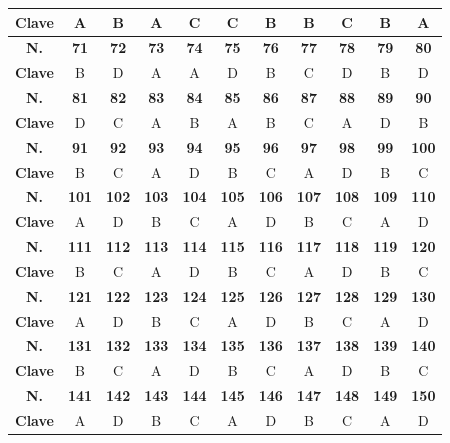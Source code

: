\begin{center}
\begin{tabular}{|c|c|c|c|c|c|c|c|c|c|c|}
\hline
\textbf{Clave} & A & B & A & C & C & B & B & C & B & A \\
\hline
\textbf{N.} & \textbf{71} & \textbf{72} & \textbf{73} & \textbf{74} & \textbf{75} & \textbf{76} & \textbf{77} & \textbf{78} & \textbf{79} & \textbf{80} \\
\hline
\textbf{Clave} & B & D & A & A & D & B & C & D & B & D \\
\hline
\textbf{N.} & \textbf{81} & \textbf{82} & \textbf{83} & \textbf{84} & \textbf{85} & \textbf{86} & \textbf{87} & \textbf{88} & \textbf{89} & \textbf{90} \\
\hline
\textbf{Clave} & D & C & A & B & A & B & C & A & D & B \\
\hline
\textbf{N.} & \textbf{91} & \textbf{92} & \textbf{93} & \textbf{94} & \textbf{95} & \textbf{96} & \textbf{97} & \textbf{98} & \textbf{99} & \textbf{100} \\
\hline
\textbf{Clave} & B & C & A & D & B & C & A & D & B & C \\
\hline
\textbf{N.} & \textbf{101} & \textbf{102} & \textbf{103} & \textbf{104} & \textbf{105} & \textbf{106} & \textbf{107} & \textbf{108} & \textbf{109} & \textbf{110} \\
\hline
\textbf{Clave} & A & D & B & C & A & D & B & C & A & D \\
\hline
\textbf{N.} & \textbf{111} & \textbf{112} & \textbf{113} & \textbf{114} & \textbf{115} & \textbf{116} & \textbf{117} & \textbf{118} & \textbf{119} & \textbf{120} \\
\hline
\textbf{Clave} & B & C & A & D & B & C & A & D & B & C \\
\hline
\textbf{N.} & \textbf{121} & \textbf{122} & \textbf{123} & \textbf{124} & \textbf{125} & \textbf{126} & \textbf{127} & \textbf{128} & \textbf{129} & \textbf{130} \\
\hline
\textbf{Clave} & A & D & B & C & A & D & B & C & A & D \\
\hline
\textbf{N.} & \textbf{131} & \textbf{132} & \textbf{133} & \textbf{134} & \textbf{135} & \textbf{136} & \textbf{137} & \textbf{138} & \textbf{139} & \textbf{140} \\
\hline
\textbf{Clave} & B & C & A & D & B & C & A & D & B & C \\
\hline
\textbf{N.} & \textbf{141} & \textbf{142} & \textbf{143} & \textbf{144} & \textbf{145} & \textbf{146} & \textbf{147} & \textbf{148} & \textbf{149} & \textbf{150} \\
\hline
\textbf{Clave} & A & D & B & C & A & D & B & C & A & D \\

\end{tabular}
\end{center}

